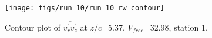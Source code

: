 \begin{figure}[H]
\centering
\texttt{[image: figs/run\_10/run\_10\_rw\_contour]}
\caption{Contour plot of $\overline{v_{r}^{\prime} v_{z}^{\prime}}$ at $z/c$=5.37, $V_{free}$=32.98, station 1.}
\label{fig:run_10_rw_contour}
\end{figure}


